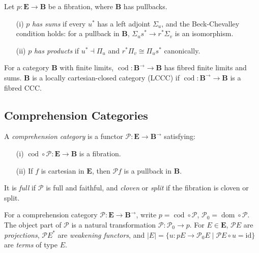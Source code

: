\documentclass{article}
\begin{document}
\begin{definition}
\label{def:3.10}
Let $p : \mathbf{E} \to \mathbf{B}$ be a fibration, where $\mathbf{B}$ has pullbacks.
\begin{enumerate}
    \item[(i)] $p$ \emph{has sums} if every $u^*$ has a left adjoint $\Sigma_u$, and the Beck-Chevalley condition holds: for a pullback in $\mathbf{B}$, $\Sigma_u s^* \to r^* \Sigma_v$ is an isomorphism.
    \item[(ii)] $p$ \emph{has products} if $u^* \dashv \Pi_u$ and $r^* \Pi_v \cong \Pi_u s^*$ canonically.
\end{enumerate}
\end{definition}

For a category $\mathbf{B}$ with finite limits, $\operatorname{cod} : \mathbf{B}^{\to} \to \mathbf{B}$ has fibred finite limits and sums. $\mathbf{B}$ is a locally cartesian-closed category (LCCC) if $\operatorname{cod} : \mathbf{B}^{\to} \to \mathbf{B}$ is a fibred CCC.

\subsection{Comprehension Categories}
\label{sec:comprehension-categories}

\begin{definition}
\label{def:4.1}
A \emph{comprehension category} is a functor $\mathscr{P} : \mathbf{E} \to \mathbf{B}^{\to}$ satisfying:
\begin{enumerate}
    \item[(i)] $\operatorname{cod} \circ \mathscr{P} : \mathbf{E} \to \mathbf{B}$ is a fibration.
    \item[(ii)] If $f$ is cartesian in $\mathbf{E}$, then $\mathscr{P} f$ is a pullback in $\mathbf{B}$.
\end{enumerate}
It is \emph{full} if $\mathscr{P}$ is full and faithful, and \emph{cloven} or \emph{split} if the fibration is cloven or split.
\end{definition}

\begin{notation}
\label{not:4.2}
For a comprehension category $\mathscr{P} : \mathbf{E} \to \mathbf{B}^{\to}$, write $p = \operatorname{cod} \circ \mathscr{P}$, $\mathscr{P}_0 = \operatorname{dom} \circ \mathscr{P}$. The object part of $\mathscr{P}$ is a natural transformation $\mathscr{P} : \mathscr{P}_0 \to p$. For $E \in \mathbf{E}$, $\mathscr{P} E$ are \emph{projections}, $\mathscr{P} E^*$ are \emph{weakening functors}, and $|E| = \{ u : p E \to \mathscr{P}_0 E \mid \mathscr{P} E \circ u = \text{id} \}$ are \emph{terms} of type $E$.
\end{notation}
\end{document}
